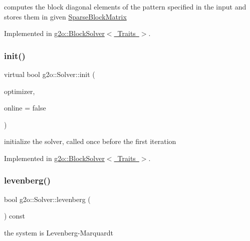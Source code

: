 computes the block diagonal elements of the pattern specified in the input and stores them in given \mbox{\hyperlink{classg2o_1_1_sparse_block_matrix}{Sparse\+Block\+Matrix}} 

Implemented in \mbox{\hyperlink{classg2o_1_1_block_solver_ac21cd7e2c9b8a1414f7a2dccb0d30a0e}{g2o\+::\+Block\+Solver$<$ Traits $>$}}.

\mbox{\label{classg2o_1_1_solver_a532174e1ee53642880d2d59c128b037b}} 
\subsubsection{\texorpdfstring{init()}{init()}}
{\footnotesize\ttfamily virtual bool g2o\+::\+Solver\+::init (\begin{DoxyParamCaption}\item[{\mbox{\hyperlink{classg2o_1_1_sparse_optimizer}{Sparse\+Optimizer}} $\ast$}]{optimizer,  }\item[{bool}]{online = {\ttfamily false} }\end{DoxyParamCaption})\hspace{0.3cm}{\ttfamily [pure virtual]}}

initialize the solver, called once before the first iteration 

Implemented in \mbox{\hyperlink{classg2o_1_1_block_solver_a8bf01018abc3bfddfa3b29a380a1d6cb}{g2o\+::\+Block\+Solver$<$ Traits $>$}}.

\mbox{\label{classg2o_1_1_solver_ab472c69fa089382242a75be76e8f883e}} 
\subsubsection{\texorpdfstring{levenberg()}{levenberg()}}
{\footnotesize\ttfamily bool g2o\+::\+Solver\+::levenberg (\begin{DoxyParamCaption}{ }\end{DoxyParamCaption}) const\hspace{0.3cm}{\ttfamily [inline]}}



the system is Levenberg-\/\+Marquardt 

\mbox{\label{classg2o_1_1_solver_a19a6b5b126e7bef1c99dff89567f2eff}} 

